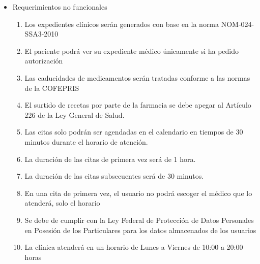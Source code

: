 \documentclass[12pt,letterpaper]{article}
\begin{document}
{\begin{itemize}
\begin{enumerate}
						\item Los médicos podrán consultar la disponibilidad de medicamentos en farmacia
						\item El encargado de farmacia podrá consultar la disponibilidad de medicamentos
						\item El sistema generará una advertencia para los usuarios encargados de farmacia cuando un medicamento esté pronto a caducar
						\item Los médicos podrían generar recetas físicas o electrónicas
						\item Cada consulta se llevará un registro de el personal que atendió al paciente
						\item El sistema permitirá agendar citas a usuarios sin registro
						\item El sistema enviará correos electrónicos de verificación, mediante tokens, para las citas
						\item El usuario recepcionista podrá consultar la agenda de cada médico titular
						\item El usuario recepcionista podrá ver las citas de todos los usuario
						\item El usuario recepcionista podrá realizar cobros de consultas
						\item El encargado de farmacia podrá realizar cobros por medicamentos
						\item El encargado de farmacia podrá modificar la existencia de medicamentos en inventario
                    \end{enumerate}
                    \item Requerimientos no funcionales
                    \begin{enumerate}
                        \item Los expedientes clínicos serán generados con base en la norma NOM-024-SSA3-2010
						\item El paciente podrá ver su expediente médico únicamente si ha pedido autorización
						\item Las caducidades de medicamentos serán tratadas conforme a las normas de la COFEPRIS
						\item El surtido de recetas por parte de la farmacia se debe apegar al Artículo 226 de la Ley General de Salud.
						\item Las citas solo podrán ser agendadas en el calendario en tiempos de 30 minutos durante el horario de atención.
						\item La duración de las citas de primera vez será de 1 hora.
						\item La duración de las citas  subsecuentes será de 30 minutos.
						\item En una cita de primera vez, el usuario no podrá escoger el médico que lo atenderá, solo el horario
						\item Se debe de cumplir con la Ley Federal de Protección de Datos Personales en Posesión de los Particulares para los datos almacenados de los usuarios
						\item La clínica atenderá en un horario de Lunes a Viernes de 10:00 a 20:00 horas
                    \end{enumerate}
            \end{itemize}
    }
\end{document}
